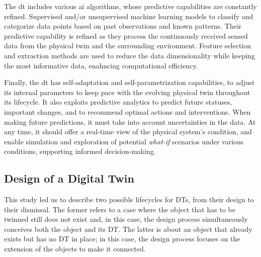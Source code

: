 The \acrshort{dt} includes various \acrshort{ai} algorithms, whose predictive capabilities are constantly refined. Supervised and/or unsupervised machine learning models to classify and categorize data points based on past observations and known patterns. Their predictive capability is refined as they process the continuously received sensed data from the physical twin and the surrounding environment. Feature selection and extraction methods are used to reduce the data dimensionality while keeping the most informative data, enahncing computational efficiency.

Finally, the \acrshort{dt} has self-adaptation and self-parametrization capabilities, to adjust its internal parameters to keep pace with the evolving physical twin throughout its lifecycle. It also exploits predictive analytics to predict future statuses, important changes, and to recommend optimal actions and interventions. When making future predictions, it must take into account uncertainties in the data. At any time, it should offer a real-time view of the physical system's condition, and enable simulation and exploration of potential \textit{what-if} scenarios under various conditions, supporting informed decision-making.

\subsection{Design of a Digital Twin}

This study led us to describe two possible lifecycles for DTs, from their design to their dismissal. The former refers to a case where the object that has to be twinned still does not exist and, in this case, the design process simultaneously conceives both the object and its DT. The latter is about an object that already exists but has no DT in place; in this case, the design process focuses on the extension of the objects to make it connected.

